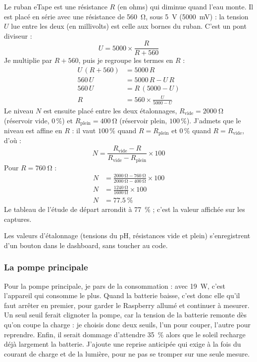 \begin{demonstration}
Le ruban eTape est une résistance $R$ (en ohms) qui diminue quand l'eau monte. Il est placé en série avec une résistance de \qty{560}{\ohm}, sous \qty{5}{V} (\qty{5000}{mV}) : la tension $U$ lue entre les deux (en millivolts) est celle aux bornes du ruban. C'est un pont diviseur :
\[
U = 5000 \times \frac{R}{R + 560}
\]
Je multiplie par $R + 560$, puis je regroupe les termes en $R$ :
\begin{align*}
U\,(R + 560) &= 5000\,R\\
560\,U &= 5000\,R - U\,R\\
560\,U &= R\,(5000 - U)\\
R &= 560 \times \frac{U}{5000 - U}
\end{align*}
Le niveau $N$ est ensuite placé entre les deux étalonnages, $R_{\mathrm{vide}} = \qty{2000}{\ohm}$ (réservoir vide, $0\,\%$) et $R_{\mathrm{plein}} = \qty{400}{\ohm}$ (réservoir plein, $100\,\%$). J'admets que le niveau est affine en $R$ : il vaut $100\,\%$ quand $R = R_{\mathrm{plein}}$ et $0\,\%$ quand $R = R_{\mathrm{vide}}$, d'où :
\[
N = \frac{R_{\mathrm{vide}} - R}{R_{\mathrm{vide}} - R_{\mathrm{plein}}}\times 100
\]
Pour $R = \qty{760}{\ohm}$ :
\begin{align*}
N &= \frac{\qty{2000}{\ohm} - \qty{760}{\ohm}}{\qty{2000}{\ohm} - \qty{400}{\ohm}}\times 100\\
N &= \frac{\qty{1240}{\ohm}}{\qty{1600}{\ohm}}\times 100\\
N &= \qty{77,5}{\percent}
\end{align*}
Le tableau de l'étude de départ arrondit à \qty{77}{\percent} ; c'est la valeur affichée sur les captures.
\end{demonstration}

Les valeurs d'étalonnage (tensions du pH, résistances vide et plein) s'enregistrent d'un bouton dans le dashboard, sans toucher au code.

\subsubsection*{La pompe principale}

Pour la pompe principale, je pars de la consommation : avec \qty{19}{W}, c'est l'appareil qui consomme le plus. Quand la batterie baisse, c'est donc elle qu'il faut arrêter en premier, pour garder le Raspberry allumé et continuer à mesurer. Un seul seuil ferait clignoter la pompe, car la tension de la batterie remonte dès qu'on coupe la charge : je choisis donc deux seuils, l'un pour couper, l'autre pour reprendre. Enfin, il serait dommage d'attendre \qty{35}{\percent} alors que le soleil recharge déjà largement la batterie. J'ajoute une reprise anticipée qui exige à la fois du courant de charge et de la lumière, pour ne pas se tromper sur une seule mesure.

